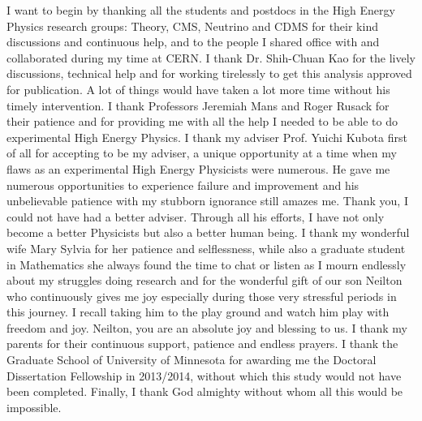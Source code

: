 I want to begin by thanking all the students and postdocs in the High Energy Physics research groups: Theory, CMS, Neutrino and CDMS for their kind discussions and continuous help, and to the people I shared office with and collaborated during my time at CERN. I thank Dr. Shih-Chuan Kao for the lively discussions, technical help and for working tirelessly to get this analysis approved for publication. A lot of things would have taken a lot more time without his timely intervention.
I thank Professors Jeremiah Mans and Roger Rusack for their patience and for providing me with all the help I needed to be able to do experimental High Energy Physics.
\newline
I thank my adviser  Prof. Yuichi Kubota first of all for accepting to be my adviser, a unique opportunity at a time when my flaws as an experimental High Energy Physicists were numerous. He gave me numerous opportunities to experience failure and improvement and his unbelievable patience with my stubborn ignorance still amazes me. Thank you, I could not have had a better adviser. Through all his efforts, I have not only become a better Physicists but also a better human being.
\newline
I thank my wonderful wife Mary Sylvia for her patience and selflessness, while also a graduate student in Mathematics she always found the time to chat or listen as I mourn endlessly about my struggles doing research and for the wonderful gift of our son Neilton who continuously gives me joy especially during those very stressful periods in this journey. I recall taking him to the play ground and watch him play with freedom and joy. Neilton, you are an absolute joy and blessing to us.
I thank my parents for their continuous support, patience and endless prayers. 
\newline
I thank the Graduate School of University of Minnesota for awarding me the Doctoral Dissertation Fellowship in 2013/2014, without which this study would not have been completed.
Finally, I thank God almighty without whom all this would be impossible.



